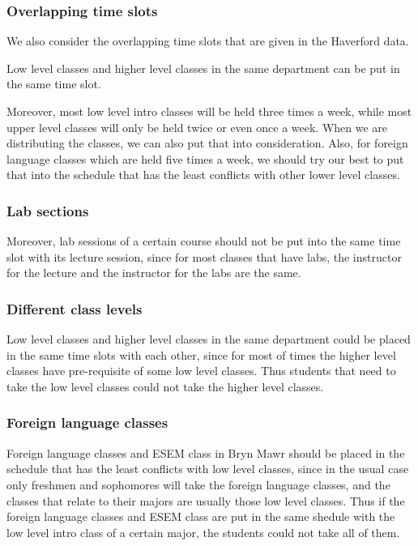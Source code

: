 \documentclass[11pt, oneside]{article}   	%
\begin{document}
\subsubsection{Overlapping time slots}
We also consider the overlapping time slots that are given in the Haverford data.

Low level classes and higher level classes in the same department can be put in the same time slot. 

Moreover, most low level intro classes will be held three times a week, while most upper level classes will only be held twice or even once a week. When we are distributing the classes, we can also put that into consideration. Also, for foreign language classes which are held five times a week, we should try our best to put that into the schedule that has the least conflicts with other lower level classes. 

\subsubsection{Lab sections}
Moreover, lab sessions of a certain course should not be put into the same time slot with its lecture session, since for most classes that have labs, the instructor for the lecture and the instructor for the labs are the same.

\subsubsection{Different class levels}
Low level classes and higher level classes in the same department could be placed in the same time slots with each other, since for most of times the higher level classes have pre-requisite of some low level classes. Thus students that need to take the low level classes could not take the higher level classes.

\subsubsection{Foreign language classes}
Foreign language classes and ESEM class in Bryn Mawr should be placed in the schedule that has the least conflicts with low level classes, since in the usual case only freshmen and sophomores will take the foreign language classes, and the classes that relate to their majors are usually those low level classes. Thus if the foreign language classes and ESEM class are put in the same shedule with the low level intro class of a certain major, the students could not take all of them.
\end{document}

